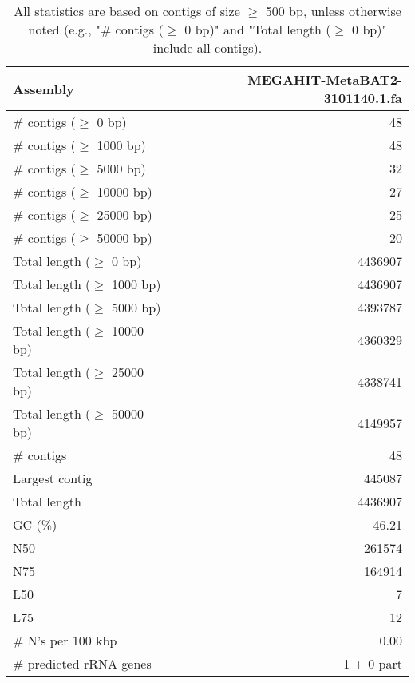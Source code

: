 \documentclass[12pt,a4paper]{article}
\begin{document}
\begin{table}[ht]
\begin{center}
\caption{All statistics are based on contigs of size $\geq$ 500 bp, unless otherwise noted (e.g., "\# contigs ($\geq$ 0 bp)" and "Total length ($\geq$ 0 bp)" include all contigs).}
\begin{tabular}{|l*{1}{|r}|}
\hline
Assembly & MEGAHIT-MetaBAT2-3101140.1.fa \\ \hline
\# contigs ($\geq$ 0 bp) & 48 \\ \hline
\# contigs ($\geq$ 1000 bp) & 48 \\ \hline
\# contigs ($\geq$ 5000 bp) & 32 \\ \hline
\# contigs ($\geq$ 10000 bp) & 27 \\ \hline
\# contigs ($\geq$ 25000 bp) & 25 \\ \hline
\# contigs ($\geq$ 50000 bp) & 20 \\ \hline
Total length ($\geq$ 0 bp) & 4436907 \\ \hline
Total length ($\geq$ 1000 bp) & 4436907 \\ \hline
Total length ($\geq$ 5000 bp) & 4393787 \\ \hline
Total length ($\geq$ 10000 bp) & 4360329 \\ \hline
Total length ($\geq$ 25000 bp) & 4338741 \\ \hline
Total length ($\geq$ 50000 bp) & 4149957 \\ \hline
\# contigs & 48 \\ \hline
Largest contig & 445087 \\ \hline
Total length & 4436907 \\ \hline
GC (\%) & 46.21 \\ \hline
N50 & 261574 \\ \hline
N75 & 164914 \\ \hline
L50 & 7 \\ \hline
L75 & 12 \\ \hline
\# N's per 100 kbp & 0.00 \\ \hline
\# predicted rRNA genes & 1 + 0 part \\ \hline
\end{tabular}
\end{center}
\end{table}
\end{document}
